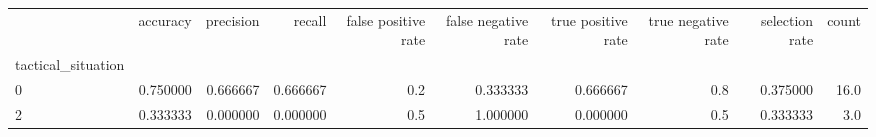 \begin{tabular}{lrrrrrrrrr}
\toprule
{} &  accuracy &  precision &    recall &  false positive rate &  false negative rate &  true positive rate &  true negative rate &  selection rate &  count \\
tactical\_situation &           &            &           &                      &                      &                     &                     &                 &        \\
\midrule
0                  &  0.750000 &   0.666667 &  0.666667 &                  0.2 &             0.333333 &            0.666667 &                 0.8 &        0.375000 &   16.0 \\
2                  &  0.333333 &   0.000000 &  0.000000 &                  0.5 &             1.000000 &            0.000000 &                 0.5 &        0.333333 &    3.0 \\
\bottomrule
\end{tabular}
